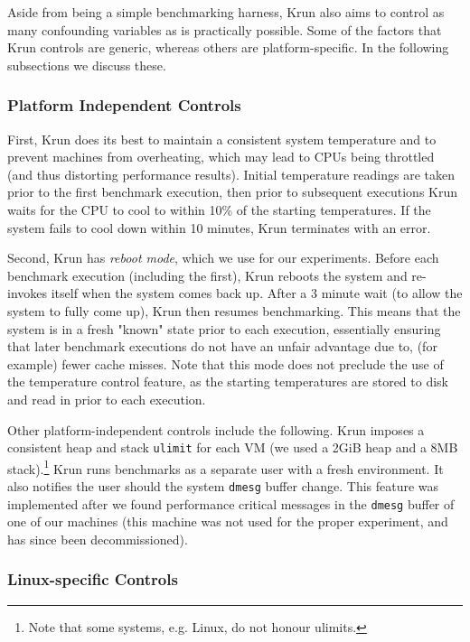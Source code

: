 \documentclass[10pt,preprint]{sigplanconf}
\newcommand{\krun}{Krun\xspace}
\begin{document}
Aside from being a simple benchmarking harness, \krun also aims to control as
many confounding variables as is practically possible. Some of the factors that
\krun controls are generic, whereas others are platform-specific. In the
following subsections we discuss these.

\subsubsection{Platform Independent Controls}

First, \krun does its best to maintain a consistent system temperature and to
prevent machines from overheating, which may lead to CPUs being throttled (and
thus distorting performance results). Initial temperature readings are taken
prior to the first benchmark execution, then prior to subsequent executions
\krun waits for the CPU to cool to within 10\%{} of the starting temperatures.
If the system fails to cool down within 10 minutes, \krun terminates with an
error.

Second, \krun has \emph{reboot mode}, which we use for our experiments. Before
each benchmark execution (including the first), \krun reboots the system and
re-invokes itself when the system comes back up. After a 3 minute wait (to
allow the system to fully come up), \krun then resumes benchmarking. This means
that the system is in a fresh "known" state prior to each execution,
essentially ensuring that later benchmark executions do not have an unfair
advantage due to, (for example) fewer cache misses. Note that this mode does
not preclude the use of the temperature control feature, as the starting
temperatures are stored to disk and read in prior to each execution.

Other platform-independent controls include the following. \krun imposes a
consistent heap and stack \texttt{ulimit} for each VM (we used a 2GiB heap and
a 8MB stack).\footnote{Note that some systems, e.g. Linux, do not honour
ulimits.} \krun runs benchmarks as a separate user with a fresh environment. It
also notifies the user should the system \texttt{dmesg} buffer
change. This feature was implemented after we found performance critical
messages in the \texttt{dmesg} buffer of one of our machines (this machine was
not used for the proper experiment, and has since been decommissioned).

\subsubsection{Linux-specific Controls}
\end{document}
